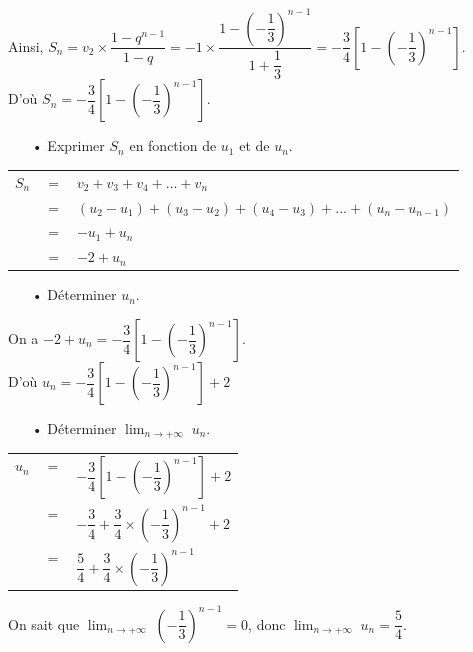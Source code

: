 Ainsi, $S_n = v_2 \times \dfrac{1 - q^{n-1}}{1 - q} = -1\times \dfrac{1-\left(-\dfrac{1}{3}\right)^{n-1}}{1 + \dfrac{1}{3}} = -\dfrac{3}{4}\left[1 - \left(-\dfrac{1}{3}\right)^{n-1}\right]$. \\

D'où $S_n = -\dfrac{3}{4}\left[1 - \left(-\dfrac{1}{3}\right)^{n-1}\right]$. 

\vspace*{.3cm}

\begin{itemize}
\item[•] Exprimer $S_n$ en fonction de $u_1$ et de $u_{n}$. \\
\end{itemize}

\begin{tabular}{lll}
$S_n$ & $ = $ & $ v_2 + v_3 + v_4 + ... + v_n$ \\
& $=$ & $\left(u_2 - u_1\right) + \left(u_3-u_2\right) + \left(u_4 - u_3\right) + ... + \left(u_{n} - u_{n-1}\right)$ \\
& $=$ & $-u_1 + u_{n}$ \\
& $=$ & $-2 + u_{n}$ \\
\end{tabular}

\vspace*{.3cm}

\begin{itemize}
\item[•] Déterminer $u_n$. \\
\end{itemize}

On a $-2 + u_{n} = -\dfrac{3}{4}\left[1 - \left(-\dfrac{1}{3}\right)^{n-1}\right]$. \\

D'où $u_{n} = -\dfrac{3}{4}\left[1 - \left(-\dfrac{1}{3}\right)^{n-1}\right] + 2$ \\

\vspace*{.3cm}

\begin{itemize}
\item[•] Déterminer $ \displaystyle {\lim_{n \rightarrow +\infty}} \; u_n$. \\
\end{itemize}

\vspace*{.3cm}

\begin{tabular}{lll}
$u_n$ & $=$ & $-\dfrac{3}{4}\left[1-\left(-\dfrac{1}{3}\right)^{n-1}\right] + 2$ \vspace*{.3cm} \\
& $=$ & $-\dfrac{3}{4} + \dfrac{3}{4} \times \left(-\dfrac{1}{3}\right)^{n-1} + 2$ \vspace*{.3cm} \\
& $=$ & $\dfrac{5}{4} + \dfrac{3}{4} \times \left(-\dfrac{1}{3}\right)^{n-1}$ \vspace*{.3cm} \\
\end{tabular}

\vspace*{.3cm}

On sait que $ \displaystyle {\lim_{n \rightarrow +\infty}} \; \left(-\dfrac{1}{3}\right)^{n-1} = 0$, donc $ \displaystyle {\lim_{n \rightarrow +\infty}} \; u_n = \dfrac{5}{4}$. \\


\ifdefined\COMPLETE
\else
    
\fi